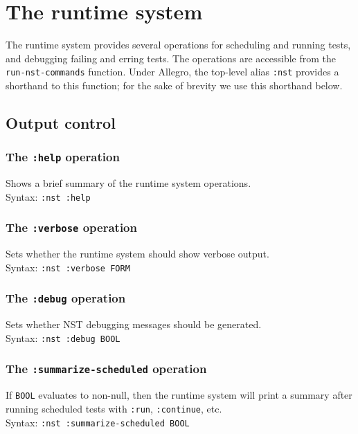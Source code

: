 \documentclass{article}
\begin{document}
\section{The runtime system}
The runtime system provides several operations for scheduling and
running tests, and debugging failing and erring tests.  The operations
are accessible from the
\texttt{run-nst-commands}
function.  Under Allegro, the top-level alias
\texttt{:nst} provides a shorthand to this
function; for the sake of brevity we use this shorthand below.

\subsection{Output control}
\subsubsection{The \texttt{:help} operation}
%
Shows a brief summary of the runtime system operations.
\\ Syntax: \texttt{:nst :help}

\subsubsection{The \texttt{:verbose} operation}
%
Sets whether the runtime system should show verbose output.
\\ Syntax: \texttt{:nst :verbose FORM}

\subsubsection{The \texttt{:debug} operation}
%
Sets whether NST debugging messages should be generated.
\\ Syntax: \texttt{:nst :debug BOOL}

\subsubsection{The \texttt{:summarize-scheduled} operation}
%
If \texttt{BOOL} evaluates to non-null, then the runtime system will
print a summary after running scheduled tests with \texttt{:run},
\texttt{:continue}, etc.
\\ Syntax: \texttt{:nst :summarize-scheduled BOOL}
\end{document}

